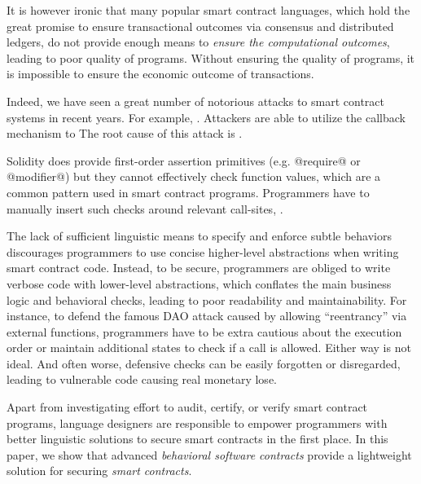 \documentclass[acmsmall,review,anonymous]{acmart}\settopmatter{printfolios=true,printccs=false,printacmref=false}
\begin{document}
It is however ironic that many popular smart contract languages, which hold the
great promise to ensure transactional outcomes via consensus and distributed
ledgers, do not provide enough means to \emph{ensure the computational outcomes},
leading to poor quality of programs.
Without ensuring the quality of programs, it is impossible to ensure
the economic outcome of transactions.

Indeed, we have seen a great number of notorious attacks to smart contract
systems in recent years.
For example, .
Attackers are able to utilize
the callback mechanism to 
The root cause of this attack is .

Solidity does provide first-order assertion primitives (e.g. @require@ or
@modifier@) but they cannot effectively check function values, which are a
common pattern used in smart contract programs. Programmers have to
manually insert such checks around relevant call-sites, .

The lack of sufficient linguistic means to specify and enforce subtle behaviors
discourages programmers to use concise higher-level abstractions when writing
smart contract code.
Instead, to be secure, programmers are obliged to write verbose code with
lower-level abstractions, which conflates the main business logic and
behavioral checks, leading to poor readability and maintainability.
For instance, to defend the famous DAO attack  caused by allowing
``reentrancy'' via external functions, programmers have to be extra cautious
about the execution order or maintain additional states to check if a call is
allowed. Either way is not ideal.
And often worse, defensive checks can be easily forgotten or disregarded,
leading to vulnerable code causing real monetary lose.

Apart from investigating effort to audit, certify, or verify smart contract programs,
language designers are responsible to empower programmers with better
linguistic solutions to secure smart contracts in the first place.
In this paper, we show that advanced \emph{behavioral software contracts} provide a
lightweight solution for securing \emph{smart contracts}.
\end{document}
